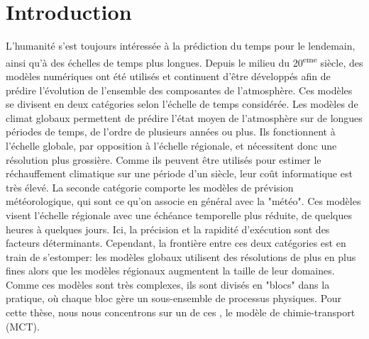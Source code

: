 \chapter*[Introduction]{Introduction}
\renewcommand{\thefigure}{\arabic{figure}}


L'humanité s'est toujours intéressée à la prédiction du temps pour le lendemain,
ainsi qu'à des échelles de temps plus longues. Depuis le milieu du
20\textsuperscript{eme} siècle, des modèles numériques ont été utilisés et
continuent d'être développés afin de prédire l'évolution de l'ensemble des
composantes de l'atmosphère. Ces modèles se divisent en deux catégories selon
l'échelle de temps considérée. Les modèles de climat globaux permettent de
prédire l'état moyen de l'atmosphère sur de longues périodes de temps, de
l'ordre de plusieurs années ou plus. Ils fonctionnent à l'échelle
globale, par opposition à l'échelle régionale, et nécessitent donc une
résolution plus grossière. Comme ils peuvent être utilisés pour estimer le
réchauffement climatique sur une période d'un siècle, leur coût informatique est
très élevé.  La seconde catégorie comporte les modèles de prévision
météorologique, qui sont ce qu'on associe en général avec la "météo".  Ces
modèles visent l'échelle régionale avec une échéance temporelle plus réduite, de
quelques heures à quelques jours. Ici, la précision et la rapidité d'exécution
sont des facteurs déterminants.  Cependant, la frontière entre ces deux
catégories est en train de s'estomper: les modèles globaux utilisent des
résolutions de plus en plus fines alors que les modèles régionaux augmentent la
taille de leur domaines. Comme ces modèles sont très complexes, ils sont divisés
en "blocs" dans la pratique, où chaque bloc gère un sous-ensemble de processus
physiques. Pour cette thèse, nous nous concentrons sur un de ces \DIFdelbegin {}\DIFdelend \DIFaddbegin {}\DIFaddend ,
le modèle de chimie-transport (MCT).

